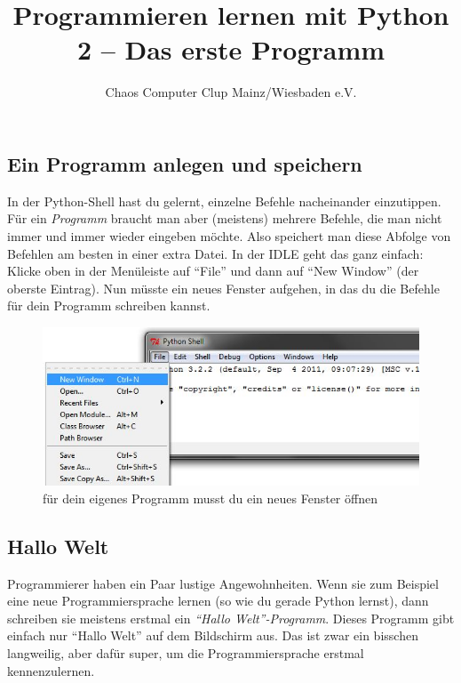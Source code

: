 



	\title{Programmieren lernen mit Python\\2 – Das erste Programm}
	\author{Chaos Computer Clup Mainz/Wiesbaden e.V.}
	\maketitle
	
	\subsection*{Ein Programm anlegen und speichern}
	In der Python-Shell hast du gelernt, einzelne Befehle nacheinander einzutippen. Für ein \emph{Programm} braucht man aber (meistens) mehrere Befehle, die man nicht immer und immer wieder eingeben möchte. Also speichert man diese Abfolge von Befehlen am besten in einer extra Datei. In der IDLE geht das ganz einfach: Klicke oben in der Menüleiste auf \enquote{File} und dann auf \enquote{New Window} (der oberste Eintrag). Nun müsste ein neues Fenster aufgehen, in das du die Befehle für dein Programm schreiben kannst.
	
	\begin{figure}[htbp]
		\centering
		\includegraphics[width=1\textwidth]{img/new.jpg}
		\caption{für dein eigenes Programm musst du ein neues Fenster öffnen}
		\label{new}
	\end{figure}
	
	\subsection*{Hallo Welt}
	Programmierer haben ein Paar lustige Angewohnheiten. Wenn sie zum Beispiel eine neue Programmiersprache lernen (so wie du gerade Python lernst), dann schreiben sie meistens erstmal ein \emph{\enquote{Hallo Welt}-Programm}. Dieses Programm gibt einfach nur \enquote{Hallo Welt} auf dem Bildschirm aus. Das ist zwar ein bisschen langweilig, aber dafür super, um die Programmiersprache erstmal kennenzulernen.
	
